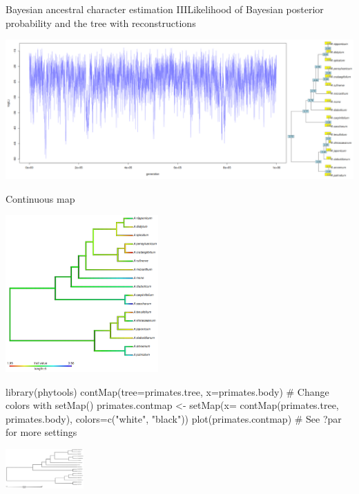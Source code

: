 \documentclass[compress, ucs, xelatex, 11pt, xcolor=svgnames, aspectratio=169,
	hyperref={
		bookmarks=true,
		unicode=true,
		colorlinks=true,
		pdftitle={Molecular data in R},
		plainpages=false,
		pdfauthor={Vojtech Zeisek},
		pdfsubject={Course about phylogeny and evolution in R},
		pdfcreator={XeLaTeX},
		pdfkeywords={R, evolution, phylogeny, molecular data},
		linkcolor=Crimson, %
		anchorcolor=Magenta, %
		citecolor=Magenta, %
		filecolor=Magenta, %
		menucolor=Magenta, %
		urlcolor=DodgerBlue, %
		pdftex},
	url={hyphens, lowtilde} %
	]{beamer}
\begin{document}
\begin{frame}{Bayesian ancestral character estimation III}{Likelihood of Bayesian posterior probability and the tree with reconstructions}
	\begin{center}
		\includegraphics[width=\textwidth-3cm]{ancbayes.png}
	\end{center}
\end{frame}

\begin{frame}[fragile]{Continuous map}
	\begin{multicols}{2}
		\vfill
		\begin{center}
			\includegraphics[height=6cm]{contmap.png}
		\end{center}
		\vfill
		\begin{spluscode}
    library(phytools)
    contMap(tree=primates.tree,
      x=primates.body)
    # Change colors with setMap()
    primates.contmap <- setMap(x=
      contMap(primates.tree,
      primates.body),
      colors=c("white", "black"))
    plot(primates.contmap)
    # See ?par for more settings
		\end{spluscode}
		\vfill
		\begin{center}
			\includegraphics[height=1.5cm]{contmapbw.png}
		\end{center}
		\vfill
	\end{multicols}
\end{frame}
\end{document}
